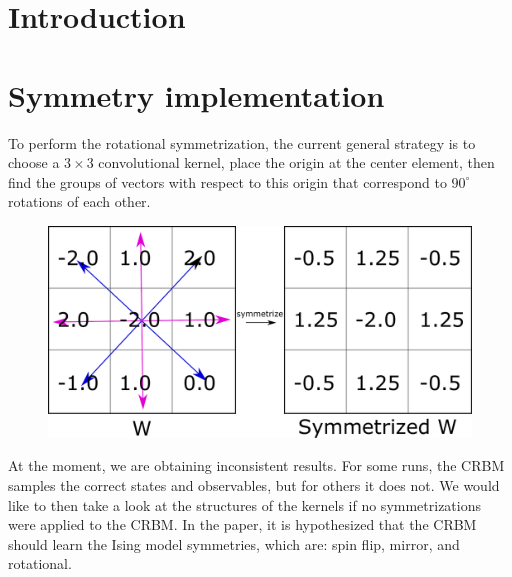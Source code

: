 \documentclass[12pt, two sided]{article}
\begin{document}


\section{Introduction}


\section{Symmetry implementation}

To perform the rotational symmetrization, the current general strategy is to choose a $3\times3$ convolutional kernel, place the origin at the center element, then find the groups of vectors with respect to this origin that correspond to $90^\circ$ rotations of each other. 

\begin{figure}[h!]
\includegraphics[width=\textwidth]{../figures/symmetrization_diagram.pdf}
\end{figure}

At the moment, we are obtaining inconsistent results. For some runs, the CRBM samples the correct states and observables, but for others it does not. We would like to then take a look at the structures of the kernels if no symmetrizations were applied to the CRBM. In the paper, it is hypothesized that the CRBM should learn the Ising model symmetries, which are: spin flip, mirror, and rotational.
\end{document}
